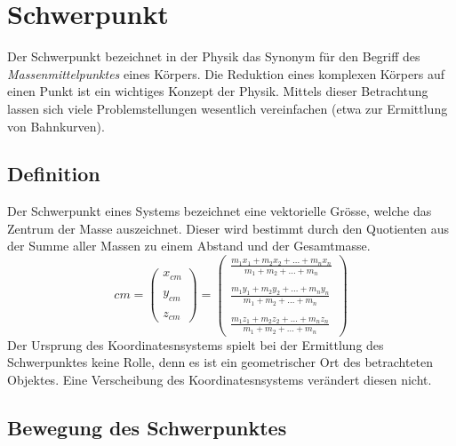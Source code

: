 \chapter{Schwerpunkt}

Der Schwerpunkt bezeichnet in der Physik das Synonym für den Begriff des
\textit{Massenmittelpunktes} eines Körpers. Die Reduktion eines komplexen
Körpers auf einen Punkt ist ein wichtiges Konzept der Physik. 
Mittels dieser Betrachtung lassen sich viele Problemstellungen wesentlich 
vereinfachen (etwa zur Ermittlung von Bahnkurven).

\newpage
\section{Definition}
Der Schwerpunkt eines Systems bezeichnet eine vektorielle Grösse,
welche das Zentrum der Masse auszeichnet. Dieser wird bestimmt
durch den Quotienten aus der Summe aller Massen zu einem Abstand
und der Gesamtmasse.
\[ \boxed{ cm =  
	\begin{pmatrix} 
		x_{cm} \\ 
		\\
		y_{cm} \\
		\\
		z_{cm}
	\end{pmatrix} 
	= \displaystyle
	\begin{pmatrix} \displaystyle
		\frac{m_1 x_1 + m_2 x_2 + \dots + m_n x_n}
			{m_1 + m_2 + \dots + m_n} \\
		\\ \displaystyle
		\frac{m_1 y_1 + m_2 y_2 + \dots + m_n y_n}
			{m_1 + m_2 + \dots + m_n} \\
		\\ \displaystyle
		\frac{m_1 z_1 + m_2 z_2 + \dots + m_n z_n}
			{m_1 + m_2 + \dots + m_n}
	\end{pmatrix} }
\]
Der Ursprung des Koordinatesnsystems spielt bei der Ermittlung des
Schwerpunktes keine Rolle, denn es ist ein geometrischer Ort des 
betrachteten Objektes. Eine Verscheibung des Koordinatesnsystems
verändert diesen nicht.

\section{Bewegung des Schwerpunktes}

